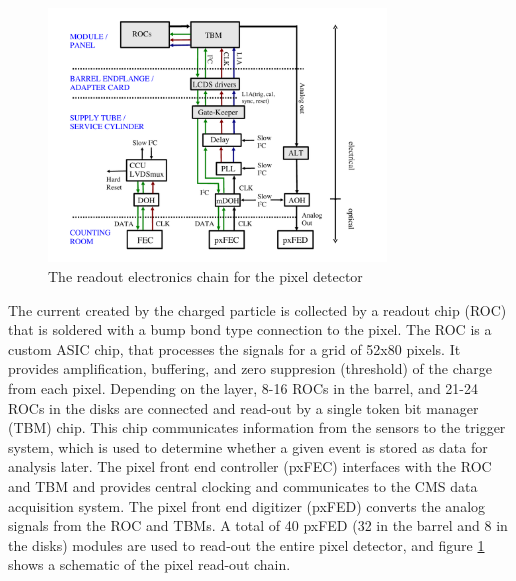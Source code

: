 \begin{figure}[h]
   \centering
  \includegraphics[width=0.8\textwidth]{Figures/CMS_Diagrams/Tracker__Pixel_Readout.pdf}
  \caption{The readout electronics chain for the pixel detector} \label{fig:tracker_pixel_readout}
\end{figure}


\par The current created by the charged particle is collected by a
readout chip (ROC) that is soldered with a bump bond type connection
to the pixel.  The ROC is a custom ASIC chip, that processes the
signals for a grid of 52x80 pixels.  It provides amplification,
buffering, and zero suppresion (threshold) of the charge from each
pixel.  Depending on the layer, 8-16 ROCs in the barrel, and 21-24 ROCs in
the disks are connected and read-out by a single token bit manager
(TBM) chip.  This chip communicates information from the sensors to
the trigger system, which is used to determine whether a given event
is stored as data for analysis later.  The pixel front end controller
(pxFEC) interfaces with the ROC and TBM and provides central clocking
and communicates to the CMS data acquisition system.  The pixel front
end digitizer (pxFED) converts the analog signals from the ROC and
TBMs.  A total of 40 pxFED (32 in the barrel and 8 in the disks)
modules are used to read-out the entire pixel detector, and figure
\ref{fig:tracker_pixel_readout} shows a schematic of the pixel
read-out chain. 

